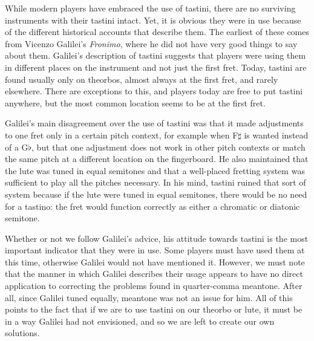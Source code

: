While modern players have embraced the use of tastini, there are no surviving instruments with their tastini intact.
Yet, it is obvious they were in use because of the different historical accounts that describe them. The earliest of
these comes from Vicenzo Galilei's \textit{Fronimo}, where he did not have very good things to say about them. Galilei's
description of tastini suggests that players were using them in different places on the instrument and not just the
first fret.\autocite[165]{VG:1} Today, tastini are found usually only on theorbos, almost always at the first fret, and
rarely elsewhere. There are exceptions to this, and players today are free to put tastini anywhere, but the most common
location seems to be at the first fret.

Galilei's main disagreement over the use of tastini was that it made adjustments to one fret only in a certain pitch
context, for example when F$\sharp$ is wanted instead of a G$\flat$, but that one adjustment does not work in other
pitch contexts or match the same pitch at a different location on the fingerboard. He also maintained that the lute was
tuned in equal semitones and that a well-placed fretting system was sufficient to play all the pitches necessary. In his
mind, tastini ruined that sort of system because if the lute were tuned in equal semitones, there would be no need for a
tastino: the fret would function correctly as either a chromatic or diatonic semitone.

Whether or not we follow Galilei's advice, his attitude towards tastini is the most important indicator that they were
in use. Some players must have used them at this time, otherwise Galilei would not have mentioned it. However, we must
note that the manner in which Galilei describes their usage appears to have no direct application to correcting the
problems found in quarter-comma meantone. After all, since Galilei tuned equally, meantone was not an issue for him. All
of this points to the fact that if we are to use tastini on our theorbo or lute, it must be in a way Galilei had not
envisioned, and so we are left to create our own solutions.

